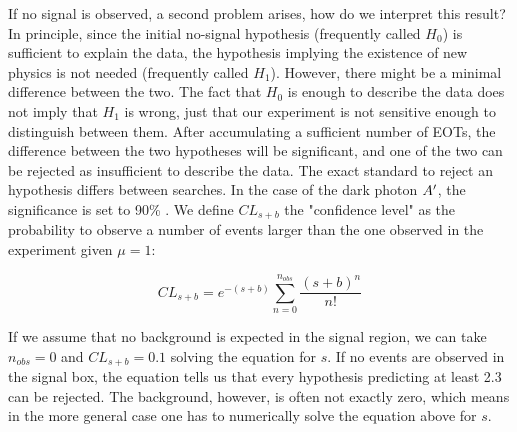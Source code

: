 If no signal is observed, a second problem arises, how do we interpret this result? In principle, since the initial no-signal hypothesis (frequently called $H_0$) is sufficient to explain the data, the hypothesis implying the existence of new physics is not needed (frequently called $H_1$). However, there might be a minimal difference between the two. The fact that $H_0$ is enough to describe the data does not imply that $H_1$ is wrong, just that our experiment is not sensitive enough to distinguish between them. After accumulating a sufficient number of EOTs, the difference between the two hypotheses will be significant, and one of the two can be rejected as insufficient to describe the data.
The exact standard to reject an hypothesis differs between searches. In the case of the dark photon $A'$, the significance is set to 90\% \cite{battaglieri2017cosmic}. We define $CL_{s+b}$ the "confidence level" as the probability to observe a number of events larger than the one observed in the experiment given $\mu = 1$:

\begin{equation}
  \label{eq:confidence-level-poisson}
  CL_{s+b} = e^{-(s+b)}\sum^{n_{obs}}_{n=0} \frac{(s+b)^n}{n!}
\end{equation}

If we assume that no background is expected in the signal region, we can take $n_{obs} = 0$ and $CL_{s+b} = 0.1$ solving the equation for $s$. If no events are observed in the signal box, the equation tells us that every hypothesis predicting at least 2.3 can be rejected. The background, however, is often not exactly zero, which means in the more general case one has to numerically solve the equation above for $s$.

